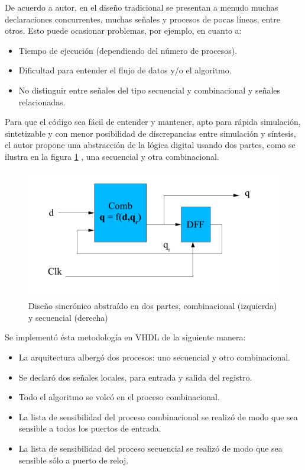 De acuerdo a autor, en el diseño  tradicional se presentan a menudo muchas declaraciones concurrentes, muchas señales y procesos de pocas líneas, entre otros. Esto puede ocasionar problemas, por ejemplo, en cuanto a:

\begin{itemize}
\item
Tiempo de ejecución (dependiendo del número de procesos).

\item 
Dificultad para entender el flujo de datos y/o el algoritmo.

\item
No distinguir entre señales del tipo secuencial y combinacional y señales relacionadas.

\end{itemize}

Para que el código sea fácil de entender y mantener, apto para rápida simulación, sintetizable y con menor posibilidad de discrepancias entre simulación y síntesis, el autor propone una abstracción de la lógica digital usando dos partes, como se ilustra en la figura \ref{2_process_scheme} , una secuencial y otra combinacional.

\begin{figure}
\centering
\includegraphics[scale=0.5]{./Figures/2_process_scheme.png}
\caption{Diseño sincrónico abstraído en dos partes, combinacional (izquierda) y secuencial (derecha)}
\label{2_process_scheme}
\end{figure}

Se implementó ésta metodología en VHDL de la siguiente manera:

\begin{itemize}
\item
La arquitectura albergó dos procesos: uno secuencial y otro combinacional.
\item
Se declaró dos señales locales, para entrada y salida del registro.
\item
Todo el algoritmo se volcó en el proceso combinacional.
\item
La lista de sensibilidad del proceso combinacional se realizó de modo que sea sensible a todos los puertos de entrada.
\item
La lista de sensibilidad del proceso secuencial se realizó de modo que sea sensible sólo a puerto de reloj.
\end{itemize}




